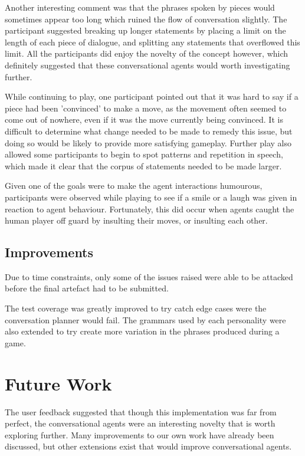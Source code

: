\documentclass{article}
\begin{document}
Another interesting comment was that the phrases spoken by pieces would sometimes appear too long which ruined the flow of conversation slightly. The participant suggested breaking up longer statements by placing a limit on the length of each piece of dialogue, and splitting any statements that overflowed this limit. All the participants did enjoy the novelty of the concept however, which definitely suggested that these conversational agents would worth investigating further.

While continuing to play, one participant pointed out that it was hard to say if a piece had been 'convinced' to make a move, as the movement often seemed to come out of nowhere, even if it was the move currently being convinced. It is difficult to determine what change needed to be made to remedy this issue, but doing so would be likely to provide more satisfying gameplay. Further play also allowed some participants to begin to spot patterns and repetition in speech, which made it clear that the corpus of statements needed to be made larger. 

Given one of the goals were to make the agent interactions humourous, participants were observed while playing to see if a smile or a laugh was given in reaction to agent behaviour. Fortunately, this did occur when agents caught the human player off guard by insulting their moves, or insulting each other. 

\subsection{Improvements}

Due to time constraints, only some of the issues raised were able to be attacked before the final artefact had to be submitted.

The test coverage was greatly improved to try catch edge cases were the conversation planner would fail. The grammars used by each personality were also extended to try create more variation in the phrases produced during a game.

\section{Future Work}

The user feedback suggested that though this implementation was far from perfect, the conversational agents were an interesting novelty that is worth exploring further. Many improvements to our own work have already been discussed, but other extensions exist that would improve conversational agents.
\end{document}

